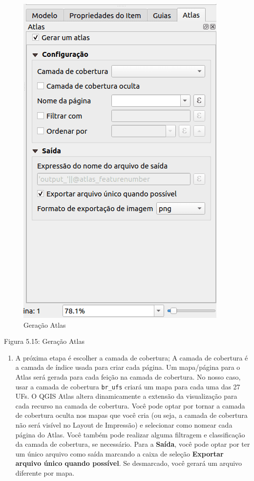 \documentclass[
]{krantz}
\providecommand{\tightlist}{%
  \setlength{\itemsep}{0pt}\setlength{\parskip}{0pt}}
\begin{document}
\begin{figure}
\centering
\includegraphics{media/modulo5/generate-atlas.png}
\caption{Geração Atlas}
\end{figure}

Figura 5.15: Geração Atlas

\begin{enumerate}
\def\labelenumi{\arabic{enumi}.}
\setcounter{enumi}{2}
\tightlist
\item
  A próxima etapa é escolher a camada de cobertura; A camada de cobertura é a camada de índice usada para criar cada página. Um mapa/página para o Atlas será gerada para cada feição na camada de cobertura. No nosso caso, usar a camada de cobertura \texttt{br\_ufs} criará um mapa para cada uma das 27 UFs. O QGIS Atlas altera dinamicamente a extensão da visualização para cada recurso na camada de cobertura. Você pode optar por tornar a camada de cobertura oculta nos mapas que você cria (ou seja, a camada de cobertura não será visível no Layout de Impressão) e selecionar como nomear cada página do Atlas. Você também pode realizar alguma filtragem e classificação da camada de cobertura, se necessário. Para a \textbf{Saída}, você pode optar por ter um único arquivo como saída marcando a caixa de seleção \textbf{Exportar arquivo único quando possível}. Se desmarcado, você gerará um arquivo diferente por mapa.
\end{enumerate}
\end{document}
